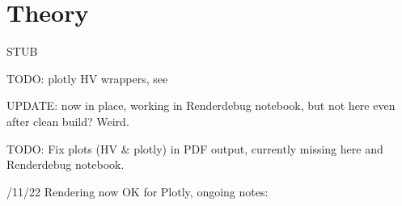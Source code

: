 \documentclass[letterpaper,10pt,english]{jupyterBook}
\begin{document}
\sphinxstepscope


\chapter{Theory}
\label{\detokenize{part1/theory_101122:theory}}\label{\detokenize{part1/theory_101122:chpt-theory}}\label{\detokenize{part1/theory_101122::doc}}
\sphinxAtStartPar
STUB

\sphinxAtStartPar
TODO: plotly HV wrappers, see 

\sphinxAtStartPar
UPDATE: now in place, working in Render\sphinxhyphen{}debug notebook, but not here \sphinxhyphen{} even after clean build? Weird.

\sphinxAtStartPar
TODO: Fix plots (HV \& plotly) in PDF output, currently missing here and Render\sphinxhyphen{}debug notebook.

/11/22 Rendering now OK for Plotly, ongoing notes: 
\end{document}
